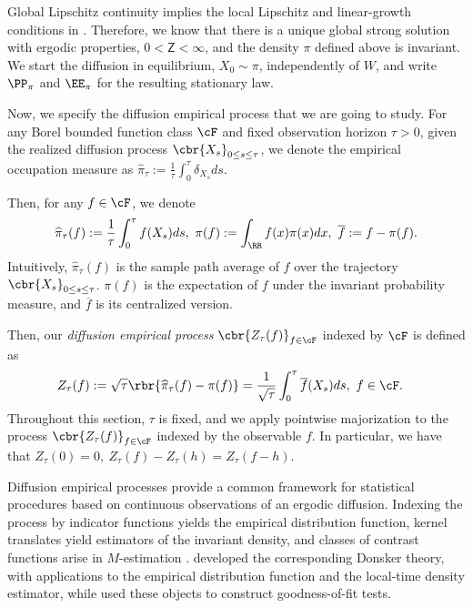 \documentclass[11pt]{article}
\begin{document}
Global Lipschitz continuity implies the local Lipschitz and linear-growth
conditions in \citet{aeckerle2021concentration}. Therefore, we know that there is a unique global strong solution with ergodic properties,
$0<\mathsf Z<\infty$, and the density $\pi$ defined above is invariant. We start the diffusion
in equilibrium, $X_0\sim\pi$, independently of $W$, and write $\PP_\pi$
and $\EE_\pi$ for the resulting stationary law.

Now, we specify the diffusion empirical process that we are going to study. For any Borel bounded function class $\cF$ and fixed observation horizon $\tau>0$, given the realized diffusion process $\cbr{X_s}_{0\le s\le \tau}$, we denote the empirical occupation measure as $\widehat\pi_\tau:=
\frac1\tau\int_0^\tau\delta_{X_s}ds$.

Then, for any $f\in\cF$, we denote
\begin{align*}
\widehat\pi_\tau(f):=
\frac1\tau\int_0^\tau f(X_s)ds,\ 
\pi(f):=
\int_{\RR}f(x)\pi(x)dx,\ 
\overline f:=f-\pi(f).
\end{align*}
Intuitively, $\widehat\pi_\tau(f)$ is the sample path average of $f$ over the trajectory $\cbr{X_s}_{0\le s\le \tau}$. $\pi(f)$ is the expectation of $f$ under the invariant probability measure, and $\overline f$ is its centralized version.

Then, our \emph{diffusion empirical process} $\cbr{Z_{\tau}(f)}_{f\in\cF}$ indexed by $\cF$ is defined as
\begin{align*}
Z_\tau(f)
&:=
\sqrt\tau\rbr{\widehat\pi_\tau(f)-\pi(f)}
=
\frac1{\sqrt\tau}\int_0^\tau\overline f(X_s)ds,\ f\in\cF.
\end{align*}
Throughout this section, $\tau$ is fixed, and we
apply pointwise majorization to the process $\cbr{Z_\tau(f)}_{f\in\cF}$ indexed by
the observable $f$. In particular, we have that $Z_\tau(0)=0,
\
Z_\tau(f)-Z_\tau(h)=Z_\tau(f-h)$.

Diffusion empirical processes provide a common framework for statistical
procedures based on continuous observations of an ergodic diffusion.
Indexing the process by indicator functions yields the empirical
distribution function, kernel translates yield estimators of the invariant
density, and classes of contrast functions arise in $M$-estimation
\citep{kutoyants1997nonparametric,vanzanten2003empirical}.
\citet{vandervaart2005donsker} developed the corresponding Donsker theory,
with applications to the empirical distribution function and the local-time
density estimator, while \citet{kutoyants2010goodness} used these objects
to construct goodness-of-fit tests.
\end{document}
